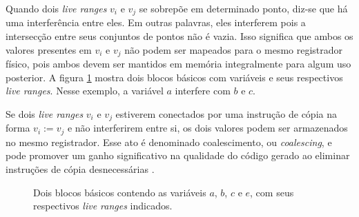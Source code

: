 \documentclass[
	12pt,				%
	openright,			%
	oneside,			%
	a4paper,			%
	tccpreliminar,			%
	]{ABNT-DC-UEL}
\begin{document}
Quando dois \textit{live ranges} $v_i$ e $v_j$ se sobrepõe em determinado ponto, diz-se que há uma interferência entre eles. Em outras palavras, eles interferem pois a intersecção entre seus conjuntos de pontos não é vazia. Isso significa que ambos os valores presentes em $v_i$ e $v_j$ não podem ser mapeados para o mesmo registrador físico, pois ambos devem ser mantidos em memória integralmente para algum uso posterior. A figura \ref{fig:3} mostra dois blocos básicos com variáveis e seus respectivos \textit{live ranges}. Nesse exemplo, a variável $a$ interfere com $b$ e $c$.

Se dois \textit{live ranges} $v_i$ e $v_j$ estiverem conectados por uma instrução de cópia na forma $v_i := v_j$ e não interferirem entre si, os dois valores podem ser armazenados no mesmo registrador. Esse ato é denominado coalescimento, ou \textit{coalescing}, e pode promover um ganho significativo na qualidade do código gerado ao eliminar instruções de cópia desnecessárias \cite{appel:96, chaitin:82, briggs:92}.

\begin{figure}
    \centering
    \caption{Dois blocos básicos contendo as variáveis $a$, $b$, $c$ e $e$, com seus respectivos \textit{live ranges} indicados.}
    \label{fig:3}
\end{figure}
\end{document}
